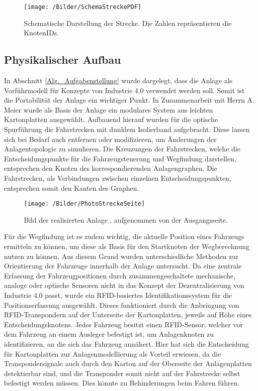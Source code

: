 			\begin{figure}[h]
				\texttt{[image: /Bilder/SchemaStreckePDF]}\\
				\caption{Schematische Darstellung der Strecke. Die Zahlen repräsentieren die KnotenIDs.}\label{Schema Strecke}
			\end{figure}
		
		\subsection{Physikalischer Aufbau}
			\label{Phys_Anlage}
			In Abschnitt \ref{Alg._Aufgabenstellung} wurde dargelegt, dass die Anlage als Vorführmodell für Konzepte von Industrie 4.0  verwendet werden soll. Somit ist die Portabilität der Anlage ein wichtiger Punkt. In Zusammenarbeit mit Herrn A. Meier wurde als Basis der Anlage ein modulares System aus leichten Kartonplatten ausgewählt. Aufbauend hierauf wurden für die optische Spurführung die Fahrstrecken mit dunklem Isolierband aufgebracht. Diese lassen sich bei Bedarf auch entfernen oder modifizieren, um Änderungen der Anlagentopologie zu simulieren. Die Kreuzungen der Fahrstrecken, welche die Entscheidungspunkte für die Fahrzeugsteuerung und Wegfindung darstellen, entsprechen den Knoten des korrespondierenden Anlagengraphen. Die Fahrstrecken, als Verbindungen zwischen einzelnen Entscheidungspunkten, entsprechen somit den Kanten des Graphen.
			
			\begin{figure}[h]
				\centering
				\texttt{[image: /Bilder/PhotoStreckeSeite]}\label{Photo Strecke}
				\vspace{0.2cm}
				\caption{Bild der realisierten Anlage \cite{Meier16}, aufgenommen von der Ausgangsseite.}
			\end{figure}
			
			Für die Wegfindung ist es zudem wichtig, die aktuelle Position eines Fahrzeugs ermitteln zu können, um diese als Basis für den Startknoten der Wegberechnung nutzen zu können. Aus diesem Grund wurden unterschiedliche Methoden zur Orientierung der Fahrzeuge innerhalb der Anlage untersucht. Da eine zentrale Erfassung der Fahrzeugpositionen durch zusammengeschaltete mechanische, analoge oder optische Sensoren nicht in das Konzept der Dezentralisierung von Industrie 4.0 passt, wurde ein \ac{RFID}-basiertes Identifikationssystem für die Positionserfassung ausgewählt. Dieses funktioniert durch die Anbringung von \ac{RFID}-Transpondern auf der Unterseite der Kartonplatten, jeweils auf Höhe eines Entscheidungsknotens. Jedes Fahrzeug besitzt einen \ac{RFID}-Sensor, welcher vor dem Fahrzeug an einem Ausleger befestigt ist, um Anlagenknoten zu identifizieren, an die sich das Fahrzeug annähert. Hier hat sich die Entscheidung für Kartonplatten zur Anlagenmodellierung als Vorteil erwiesen, da die Transpondersignale auch durch den Karton auf der Oberseite der Anlagenplatten detektierbar sind, und die Transponder somit nicht auf der Fahrstrecke selbst befestigt werden müssen. Dies könnte zu Behinderungen beim Fahren führen.
			
